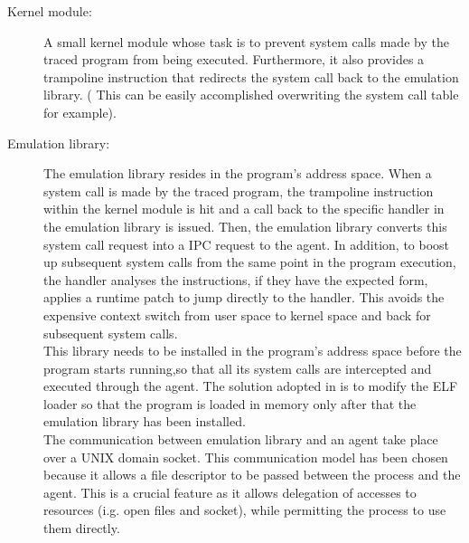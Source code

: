 \begin{description}	
	\item[Kernel module:] A small kernel module whose task is to prevent system calls made by the traced program from being executed. Furthermore, it also provides a
						 trampoline instruction that redirects the system call back to the emulation library. ( This can be easily accomplished overwriting the system call table
						 for example). 
	
	\item[Emulation library:] The emulation library resides in the program's address space. 
							 When a system call is made by the traced program, the trampoline instruction within the kernel module is hit and a call back to the specific 		
							 handler in the emulation library is issued. Then, the emulation library converts this system call request into a IPC request to the agent.
							 In addition, to boost up subsequent system calls from the same point in the program execution, the handler analyses the instructions, if they have 
							 the expected form, applies a runtime patch to jump directly to the handler. This avoids the expensive context switch from user space to kernel space 
							 and back for subsequent system calls.\\
							 This library needs to be installed in the program's address space before the program starts running,so that all its system calls are intercepted and
							 executed through the agent. The solution adopted in \citep{Garfinkel03ostia:a} is to modify the ELF loader so that the program is loaded in memory
							 only after that the emulation library has been installed. \\
							 The communication between emulation library and an agent take place over a UNIX domain socket. This communication model has been chosen because it 
							 allows a file descriptor to be passed between the process and the agent. This is a crucial feature as it allows delegation of accesses to resources
							  (i.g. open files and socket), while permitting the process to use them directly. 
							  			  

\end{description}
